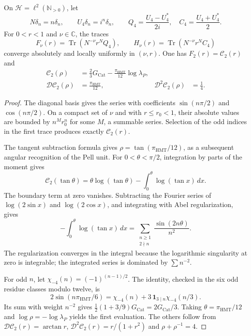 \begin{proposition}
\label{corpus9:iv:pell-evaluacion}
On \(\mathcal H=\ell^2(\mathbb N_{>0})\), let
\[
 N\delta_n=n\delta_n,\qquad U_4\delta_n=i^n\delta_n,\qquad
 Q_4=\frac{U_4-U_4^*}{2i},\quad
 C_4=\frac{U_4+U_4^*}{2}.
\]
For \(0<r<1\) and \(\nu\in\mathbb C\), the traces
\[
 F_\nu(r)=\operatorname{Tr}(N^{-\nu}r^NQ_4),\qquad
 H_\nu(r)=\operatorname{Tr}(N^{-\nu}r^NC_4)
\]
converge absolutely and locally uniformly in
\((\nu,r)\). One has \(F_2(r)=\mathcal C_2(r)\) and
\begin{align}
 \mathcal C_2(\rho)
   &=\frac23G_{\mathrm{Cat}}
     -\frac{\pi_{\mathrm{HMT}}}{12}\log\lambda_P,\\
 \mathcal D\mathcal C_2(\rho)&=\frac{\pi_{\mathrm{HMT}}}{12},
 &\mathcal D^2\mathcal C_2(\rho)&=\frac14 .
 \label{corpus9:iv:pell-valores}
\end{align}
\end{proposition}
\begin{proof}
The diagonal basis gives the series with coefficients
\(\sin(n\pi/2)\) and \(\cos(n\pi/2)\). On a compact set of
\(\nu\) and with \(r\leq r_0<1\), their absolute values are
bounded by \(n^M r_0^n\) for some \(M\), a summable series.
Selection of the odd indices in the first trace
produces exactly \(\mathcal C_2(r)\).

The tangent subtraction formula gives
\(\rho=\tan(\pi_{\mathrm{HMT}}/12)\), as a subsequent
angular recognition of the Pell unit. For
\(0<\theta<\pi/2\), integration by parts of the moment gives
\[
 \mathcal C_2(\tan\theta)
  =\theta\log(\tan\theta)-\int_0^\theta\log(\tan x)\,dx.
\]
The boundary term at zero vanishes. Subtracting the
Fourier series of \(\log(2\sin x)\) and \(\log(2\cos x)\),
and integrating with Abel regularization, gives
\[
 -\int_0^\theta\log(\tan x)\,dx
   =\sum_{\substack{n\geq1\\2\nmid n}}
          \frac{\sin(2n\theta)}{n^2}.
\]
The regularization converges in the integral because the
logarithmic singularity at zero is integrable; the
integrated series is dominated by \(\sum n^{-2}\).

For odd \(n\), let \(\chi_{-4}(n)=(-1)^{(n-1)/2}\).
The identity, checked in the six odd residue classes modulo
twelve, is
\[
 2\sin(n\pi_{\mathrm{HMT}}/6)
   =\chi_{-4}(n)
     +3\,\mathbf1_{3\mid n}\chi_{-4}(n/3).
\]
Its sum with weight \(n^{-2}\) gives
\(\frac12(1+3/9)G_{\mathrm{Cat}}=2G_{\mathrm{Cat}}/3\).
Taking \(\theta=\pi_{\mathrm{HMT}}/12\) and
\(\log\rho=-\log\lambda_P\) yields the first
evaluation. The others follow from
\(\mathcal D\mathcal C_2(r)=\arctan r\),
\(\mathcal D^2\mathcal C_2(r)=r/(1+r^2)\) and
\(\rho+\rho^{-1}=4\).
\end{proof}

